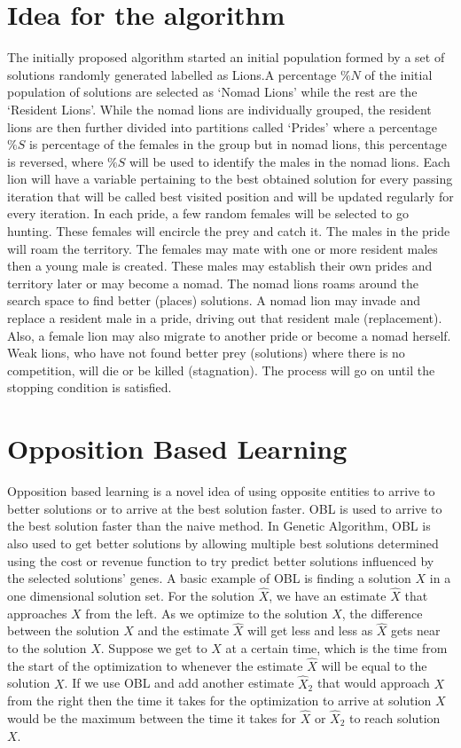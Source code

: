 \section{Idea for the algorithm}
The initially proposed algorithm started an initial population formed by a set of solutions randomly generated labelled as Lions.A percentage $\%N$ of the initial population of solutions are selected as `Nomad Lions' while the rest are the `Resident Lions'. While the nomad lions are individually grouped, the resident lions are then further divided into partitions called `Prides' where a percentage $\%S$ is percentage of the females in the group but in nomad lions, this percentage is reversed, where $\%S$ will be used to identify the males in the nomad lions.
Each lion will have a variable pertaining to the best obtained solution for every passing iteration that will be called best visited position and will be updated regularly for every iteration. In each pride, a few random females will be selected to go hunting. These females will encircle the prey and catch it. The males in the pride will roam the territory. The females may mate with one or more resident males then a young male is created. These males may establish their own prides and territory later or may become a nomad.
The nomad lions roams around the search space to find better (places) solutions. A nomad lion may invade and replace a resident male in a pride, driving out that resident male (replacement). Also, a female lion may also migrate to another pride or become a nomad herself. Weak lions, who have not found better prey (solutions) where there is no competition, will die or be killed (stagnation). The process will go on until the stopping condition is satisfied.

\section{Opposition Based Learning}
Opposition based learning is a novel idea of using opposite entities to arrive to better solutions or to arrive at the best solution faster. OBL is used to arrive to the best solution faster than the naive method. In Genetic Algorithm, OBL is also used to get better solutions by allowing multiple best solutions determined using the cost or revenue function to try predict better solutions influenced by the selected solutions' genes. A basic example of OBL is finding a solution $X$ in a one dimensional solution set. For the solution $\hat{X}$, we have an estimate $\hat{X}$ that approaches $X$ from the left. As we optimize to the solution $X$, the difference between the solution $X$ and the estimate $\hat{X}$ will get less and less as $\hat{X}$ gets near to the solution $X$. Suppose we get to $X$ at a certain time, which is the time from the start of the optimization to whenever the estimate $\hat{X}$ will be equal to the solution $ X $. If we use OBL and add another estimate $\hat{X}_2$ that would approach $X$ from the right then the time it takes for the optimization to arrive at solution $X$ would be the maximum between the time it takes for $\hat{X}$ or $\hat{X}_2$ to reach solution $X$.

